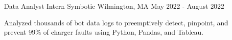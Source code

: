 \begin{cventries}
\cventry
    {Data Analyst Intern} %
    {Symbotic} %
    {Wilmington, MA} %
    {May 2022 - August 2022} %
    {
      \begin{cvitems} %
        \item {Analyzed thousands of bot data logs to preemptively detect, pinpoint, and prevent 99\% of charger faults using Python, Pandas, and Tableau.}
      \end{cvitems}
    }


\end{cventries}
